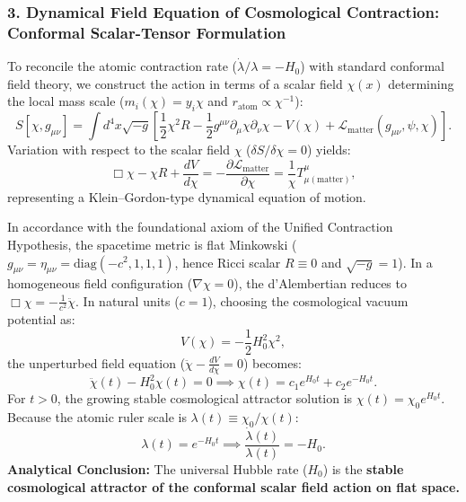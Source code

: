 \subsubsection{3. Dynamical Field Equation of Cosmological Contraction: Conformal Scalar-Tensor Formulation}
\label{sec:konformal_skalar_tensor}
To reconcile the atomic contraction rate ($\dot{\lambda}/\lambda = -H_0$) with standard conformal field theory, we construct the action in terms of a scalar field $\chi(x)$ determining the local mass scale ($m_i(\chi) = y_i \chi$ and $r_{\mathrm{atom}} \propto \chi^{-1}$):
\begin{equation}
    S[\chi, g_{\mu\nu}] = \int d^4x \sqrt{-g} \left[ \frac{1}{2} \chi^2 R - \frac{1}{2} g^{\mu\nu} \partial_\mu \chi \partial_\nu \chi - V(\chi) + \mathcal{L}_{\mathrm{matter}}(g_{\mu\nu}, \psi, \chi) \right].
    \label{eq:wetterich_skalar_eylem}
\end{equation}
Variation with respect to the scalar field $\chi$ ($\delta S / \delta \chi = 0$) yields:
\begin{equation}
    \Box \chi - \chi R + \frac{dV}{d\chi} = -\frac{\partial \mathcal{L}_{\mathrm{matter}}}{\partial \chi} = \frac{1}{\chi} T^\mu_{\mu(\mathrm{matter})},
    \label{eq:chi_alan_denklemi}
\end{equation}
representing a Klein--Gordon-type dynamical equation of motion.

In accordance with the foundational axiom of the Unified Contraction Hypothesis, the spacetime metric is flat Minkowski ($g_{\mu\nu} = \eta_{\mu\nu} = \text{diag}(-c^2, 1, 1, 1)$, hence Ricci scalar $R \equiv 0$ and $\sqrt{-g}=1$). In a homogeneous field configuration ($\nabla \chi = 0$), the d'Alembertian reduces to $\Box \chi = -\frac{1}{c^2}\ddot{\chi}$. In natural units ($c=1$), choosing the cosmological vacuum potential as:
\begin{equation}
    V(\chi) = -\frac{1}{2} H_0^2 \chi^2,
    \label{eq:vakum_baryon_potansiyel}
\end{equation}
the unperturbed field equation ($\ddot{\chi} - \frac{dV}{d\chi} = 0$) becomes:
\begin{equation}
    \ddot{\chi}(t) - H_0^2 \chi(t) = 0 \implies \chi(t) = c_1 e^{H_0 t} + c_2 e^{-H_0 t}.
    \label{eq:chi_ustel_cozum}
\end{equation}
For $t > 0$, the growing stable cosmological attractor solution is $\chi(t) = \chi_0 e^{H_0 t}$. Because the atomic ruler scale is $\lambda(t) \equiv \chi_0 / \chi(t)$:
\begin{equation}
    \lambda(t) = e^{-H_0 t} \implies \frac{\dot{\lambda}(t)}{\lambda(t)} = -H_0.
    \label{eq:hubble_baryon_turetilis}
\end{equation}
\textbf{Analytical Conclusion:} The universal Hubble rate ($H_0$) is the \textbf{stable cosmological attractor of the conformal scalar field action on flat space.}

